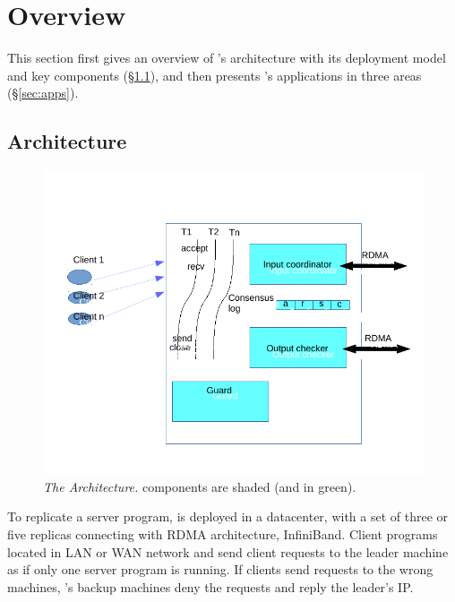

\section{\xxx Overview}\label{sec:overview}

This section first gives an overview of \xxx's architecture with its 
deployment model and key components (\S\ref{sec:arch}), and then presents 
\xxx's applications in three areas (\S\ref{sec:apps}).
 
\subsection{Architecture}\label{sec:arch}

\begin{figure}[t]
\centering
\includegraphics[width=.5\textwidth]{figures/arch}
\vspace{-.20in}
\caption{{\em The \xxx Architecture.} \xxx components are shaded (and in
  green).} \label{fig:arch}
\vspace{-.05in}
\end{figure}



To replicate a server program, \xxx is deployed in a datacenter, with a set of 
three or five replicas connecting with RDMA architecture, InfiniBand. Client 
programs located in LAN or WAN network and send client requests to the leader 
machine as if only one server program is running. If clients send requests to 
the wrong machines, \xxx's backup machines deny the requests and reply the 
leader's IP.

